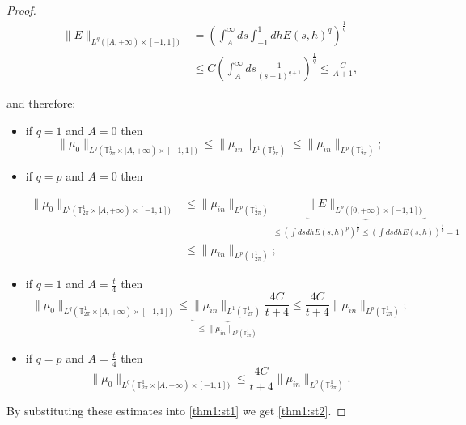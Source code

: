\documentclass[a4paper,10pt,reqno]{amsart}
\numberwithin{equation}{subsection}
\numberwithin{figure}{subsection}
\begin{document}
\begin{proof}
\begin{align*}
\|E\|_{L^q([A,+\infty)\times[-1,1])}&=\left(\int_A^{\infty}ds\int_{-1}^1dh E(s,h)^q\right)^{\frac{1}{q}}
\\
&\leq C\left(\int_A^{\infty}ds\frac{1}{(s+1)^{q+1}} \right)^{\frac{1}{q}}\leq\frac{C}{A+1},
\end{align*}

and therefore:
\begin{itemize}
\item if $q=1$ and $A=0$ then
\[
\|\mu_0\|_{L^q(\mathbb{T}^1_{2\pi}\times[A,+\infty)\times[-1,1])}\leq\|\mu_{in}\|_{L^1(\mathbb{T}^1_{2\pi})}\leq\|\mu_{in}\|_{L^p(\mathbb{T}^1_{2\pi})};
\]
\item if $q=p$ and $A=0$ then

\begin{align*}
\|\mu_0\|_{L^q(\mathbb{T}^1_{2\pi}\times[A,+\infty)\times[-1,1])}&\leq\|\mu_{in}\|_{L^p(\mathbb{T}^1_{2\pi})}\underbrace{\|E\|_{L^p([0,+\infty)\times[-1,1])}}_{\leq(\int dsdh E(s,h)^p)^{\frac{1}{p}}\leq(\int dsdh E(s,h))^{\frac{1}{p}}=1}
\\
&\leq\|\mu_{in}\|_{L^p(\mathbb{T}^1_{2\pi})};
\end{align*}

\item if $q=1$ and $A=\frac{t}{4}$ then
\[
\|\mu_0\|_{L^q(\mathbb{T}^1_{2\pi}\times[A,+\infty)\times[-1,1])}\leq\underbrace{\|\mu_{in}\|_{L^1(\mathbb{T}^1_{2\pi})}}_{\leq\|\mu_{in}\|_{L^p(\mathbb{T}^1_{2\pi})}}\frac{4C}{t+4}\leq\frac{4C}{t+4}\|\mu_{in}\|_{L^p(\mathbb{T}^1_{2\pi})};
\]
\item if $q=p$ and $A=\frac{t}{4}$ then
\[
\|\mu_0\|_{L^q(\mathbb{T}^1_{2\pi}\times[A,+\infty)\times[-1,1])}\leq\frac{4C}{t+4}\|\mu_{in}\|_{L^p(\mathbb{T}^1_{2\pi})}.
\]
\end{itemize}
By substituting these estimates into \eqref{thm1:st1} we get \eqref{thm1:st2}.
\end{proof}

\newpage
\end{document}
